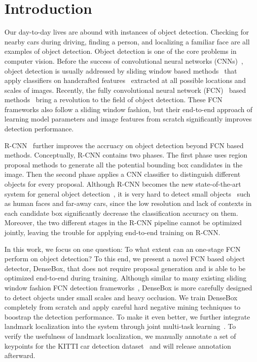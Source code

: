 \section{Introduction}

Our day-to-day lives are abound with instances of object detection. Checking for nearby cars during driving, finding a person, and localizing a familiar face are all examples of object detection. Object detection is one of the core problems in computer vision. Before the success of convolutional neural networks (CNNs)~\cite{krizhevsky2012imagenet}, object detection is usually addressed by sliding window based methods~\cite{felzenszwalb2010object, viola2004robust} that apply classifiers on handcrafted features~\cite{dalal2005histograms, lowe2004distinctive, cinbis2013segmentation} extracted at all possible locations and scales of images. Recently, the fully convolutional neural network (FCN)~\cite{long2015fully} based methods~\cite{sermanet2013overfeat, erhan2014scalable, YOLO} bring a revolution to the field of object detection. These FCN frameworks also follow a sliding window fashion, but their end-to-end approach of learning model parameters and image features from scratch significantly improves detection performance. 

R-CNN~\cite{girshick2014rich, girshick2015fast} further improves the accruacy on object detection beyond FCN based methods. Conceptually, R-CNN contains two phases. The first phase uses region proposal methods to generate all the potential bounding box candidates in the image. Then the second phase applies a CNN classifier to distinguish different objects for every proposal. Although R-CNN becomes the new state-of-the-art system for general object detection~\cite{everingham2010pascal, russakovsky2014imagenet}, it is very hard to detect small objects~\cite{pepik2015holding} such as human faces and far-away cars, since the low resolution and lack of contexts in each candidate box significantly decrease the classification accuracy on them. Moreover, the two different stages in the R-CNN pipeline cannot be optimized jointly, leaving the trouble for applying end-to-end training on R-CNN. 

In this work, we focus on one question: To what extent can an one-stage FCN perform on object detection? To this end, we present a novel FCN based object detector, DenseBox, that does not require proposal generation and is able to be optimized end-to-end during training. Although similar to many existing sliding window fashion FCN detection frameworks~\cite{sermanet2013overfeat, erhan2014scalable, YOLO}, DenseBox is more carefully designed to detect objects under small scales and heavy occlusion. We train DenseBox completely from scratch and apply careful hard negative mining techniques to boostrap the detection performance. To make it even better, we further integrate landmark localization into the system through joint multi-task learning~\cite{bengio2013representation}. To verify the usefulness of landmark localization, we manually annotate a set of keypoints for the KITTI car detection dataset~\cite{Geiger2012CVPR} and will release annotation afterward. 

